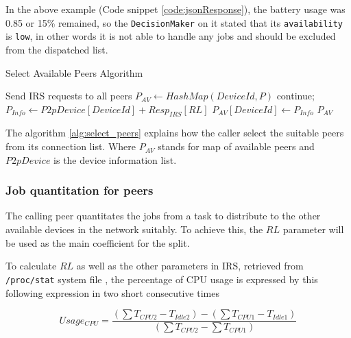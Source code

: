 \documentclass[conference]{IEEEtran}
\begin{document}
In the above example (Code snippet \ref{code:jsonResponse}), the battery usage was 0.85 or 15\% remained, so the \texttt{DecisionMaker} on it stated that its \texttt{availability} is \texttt{low}, in other words it is not able to handle any jobs and should be excluded from the dispatched list.

\begin{algorithm}

\caption{Select Available Peers Algorithm}
\label{alg:select_peers}
\begin{algorithmic}[1] 
\begin{scriptsize}
\State Send IRS requests to all peers 
\State $P_{AV} \leftarrow HashMap(DeviceId, P)$
   \State continue;
\Else
  \State $P_{Info} \leftarrow P2pDevice[DeviceId] + Resp_{IRS}[RL]$
  \State $P_{AV}[DeviceId] \leftarrow P_{Info}$
\EndIf
\EndFor
\State \Return $P_{AV}$
\EndFunction
\end{scriptsize}
\end{algorithmic}

\end{algorithm}

The algorithm \ref{alg:select_peers} explains how the caller select the suitable peers from its connection list. Where $P_{AV}$ stands for map of available peers and $P2pDevice$ is the device information list.\\

\subsubsection{Job quantitation for peers}\label{ss_jqfp}

The calling peer quantitates the jobs from a task to distribute to the other available devices in the network suitably. To achieve this, the $RL$ parameter will be used as the main coefficient for the split. 
 
To calculate $RL$ as well as the other parameters in IRS, retrieved from \texttt{/proc/stat} system file \cite{stat_explain}, the percentage of CPU usage is expressed by this following expression in two short consecutive times

\begin{equation}
\label{eq:cpu_usage}
Usage_{CPU} = \frac{(\sum{T_{CPU2}} - T_{Idle2}) - (\sum{T_{CPU1}} - T_{Idle1})}{(\sum{T_{CPU2}} - \sum{T_{CPU1}})}
\end{equation}
\end{document}
